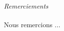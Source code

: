 \begin{center}
\huge{\emph{Remerciements}}
\end{center}

\vspace{1cm}

\paragraph{}
Nous remercions ...